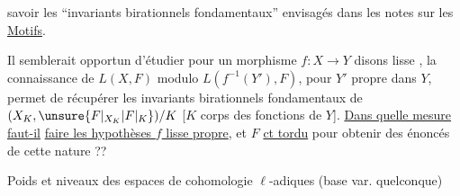 savoir les ``invariants birationnels fondamentaux''
 envisagés dans les notes sur les \uline{Motifs}.

Il semblerait opportun d'étudier 
pour un morphisme $f:X\longrightarrow Y$
disons lisse ,  la connaissance de
$L(X,F)$ modulo $L(f^{-1}(Y'),F)$,
pour $Y'$ propre dans $Y$, permet de récupérer
les invariants birationnels fondamentaux
de $(X_K,\unsure{F\vert_{X_K}|F\vert_K})/K$
[$K$ corps des fonctions de
$Y$]. \uline{Dans quelle mesure faut-il}
\uline{faire les hypothèses $f$ lisse propre}, et $F$
\uline{ct tordu} pour obtenir des énoncés
de cette nature ??

Poids et niveaux des
espaces de cohomologie
$\ell$-adiques (base var.
quelconque)
